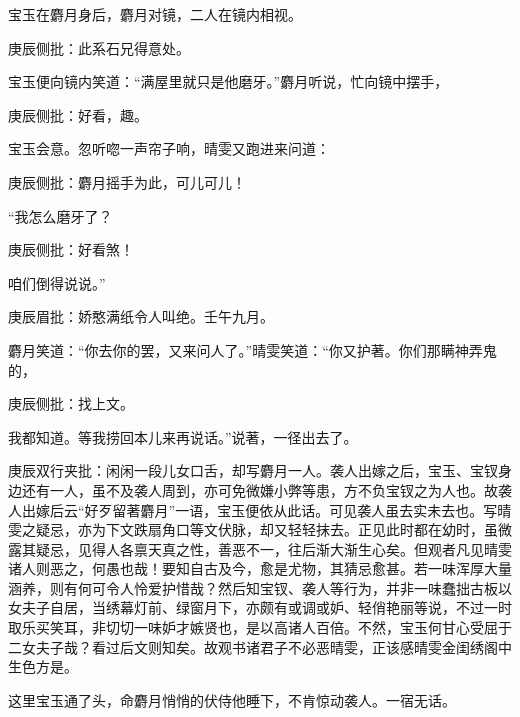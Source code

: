 \begin{parag}
    宝玉在麝月身后，麝月对镜，二人在镜内相视。\begin{note}庚辰侧批：此系石兄得意处。\end{note}宝玉便向镜内笑道：“满屋里就只是他磨牙。”麝月听说，忙向镜中摆手，\begin{note}庚辰侧批：好看，趣。\end{note}宝玉会意。忽听唿一声帘子响，晴雯又跑进来问道：\begin{note}庚辰侧批：麝月摇手为此，可儿可儿！\end{note}“我怎么磨牙了？\begin{note}庚辰侧批：好看煞！\end{note}咱们倒得说说。”\begin{note}庚辰眉批：娇憨满纸令人叫绝。壬午九月。\end{note}麝月笑道：“你去你的罢，又来问人了。”晴雯笑道：“你又护著。你们那瞒神弄鬼的，\begin{note}庚辰侧批：找上文。\end{note}我都知道。等我捞回本儿来再说话。”说著，一径出去了。\begin{note}庚辰双行夹批：闲闲一段儿女口舌，却写麝月一人。袭人出嫁之后，宝玉、宝钗身边还有一人，虽不及袭人周到，亦可免微嫌小弊等患，方不负宝钗之为人也。故袭人出嫁后云“好歹留著麝月”一语，宝玉便依从此话。可见袭人虽去实未去也。写晴雯之疑忌，亦为下文跌扇角口等文伏脉，却又轻轻抹去。正见此时都在幼时，虽微露其疑忌，见得人各禀天真之性，善恶不一，往后渐大渐生心矣。但观者凡见晴雯诸人则恶之，何愚也哉！要知自古及今，愈是尤物，其猜忌愈甚。若一味浑厚大量涵养，则有何可令人怜爱护惜哉？然后知宝钗、袭人等行为，并非一味蠢拙古板以女夫子自居，当绣幕灯前、绿窗月下，亦颇有或调或妒、轻俏艳丽等说，不过一时取乐买笑耳，非切切一味妒才嫉贤也，是以高诸人百倍。不然，宝玉何甘心受屈于二女夫子哉？看过后文则知矣。故观书诸君子不必恶晴雯，正该感晴雯金闺绣阁中生色方是。\end{note}这里宝玉通了头，命麝月悄悄的伏侍他睡下，不肯惊动袭人。一宿无话。
\end{parag}


